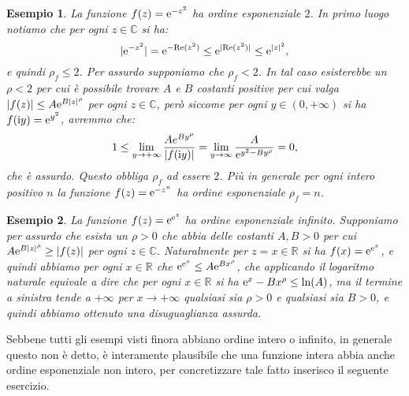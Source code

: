 \documentclass[11pt]{book}
\theoremstyle{Definizione}
\theoremstyle{TeoremaProposizioneLemmaCorollarioCongettura}
\theoremstyle{OsservazioneNotaEsempio}
\newtheorem{myes}{Esempio}[section]
\newcommand{\R}{\mathbb{R}}
\newcommand{\C}{\mathbb{C}}
\renewcommand{\Re}{\textup{Re}}
\renewcommand{\i}{\textup{i}}
\newcommand{\e}{\textup{e}}
\begin{document}
\begin{myes}
La funzione $f(z) = \e^{-z^2}$ ha ordine esponenziale $2$. In primo luogo notiamo che per ogni $z\in \C$ si ha:
$$
|\e^{-z^2}| = \e^{-\Re(z^2)} \leq \e^{|\Re(z^2)|}\leq \e^{|z|^2},
$$
e quindi $\rho_f \leq 2$. Per assurdo supponiamo che $\rho_f < 2$. In tal caso esisterebbe un $\rho < 2$ per cui è possibile trovare $A$ e $B$ costanti positive per cui valga $|f(z)| \leq A \e^{B|z|^\rho}$ per ogni $z\in \C$, però siccome per ogni $y\in (0,+\infty)$ si ha $f(\i y) = \e^{y^2}$, avremmo che:
$$
1\leq \lim_{y \to +\infty} \frac{A e^{By^\rho}}{|f(\i y)|} = \lim_{y \to \infty} \frac{A}{\e^{y^2-By^\rho}} = 0,
$$
che è assurdo. Questo obbliga $\rho_f$ ad essere $2$. Più in generale per ogni intero positivo $n$ la funzione $f(z) = \e^{-z^n}$ ha ordine esponenziale $\rho_f = n$.
\end{myes}
\begin{myes}
La funzione $f(z) = \e^{\e^{z}}$ ha ordine esponenziale infinito. Supponiamo per assurdo che esista un $\rho > 0$ che abbia delle costanti $A,B > 0$ per cui $A \e^{B|z|^\rho} \geq |f(z)|$ per ogni $z\in \C$. Naturalmente per $z = x \in \R$ si ha $f(x) = \e^{\e^{x}}$, e quindi abbiamo per ogni $x\in \R$ che $\e^{\e^{x}} \leq A \e^{B x^\rho}$, che applicando il logaritmo naturale equivale a dire che per ogni $x\in \R$ si ha $\e^{x}- B x^{\rho} \leq \ln(A)$, ma il termine a sinistra tende a $+\infty$ per $x\to +\infty$ qualsiasi sia $\rho > 0$ e qualsiasi sia $B > 0$, e quindi abbiamo ottenuto una disuguaglianza assurda.
\end{myes}
Sebbene tutti gli esempi visti finora abbiano ordine intero o infinito, in generale questo non è detto, è interamente plausibile che una funzione intera abbia anche ordine esponenziale non intero, per concretizzare tale fatto inserisco il seguente esercizio.
\end{document}
